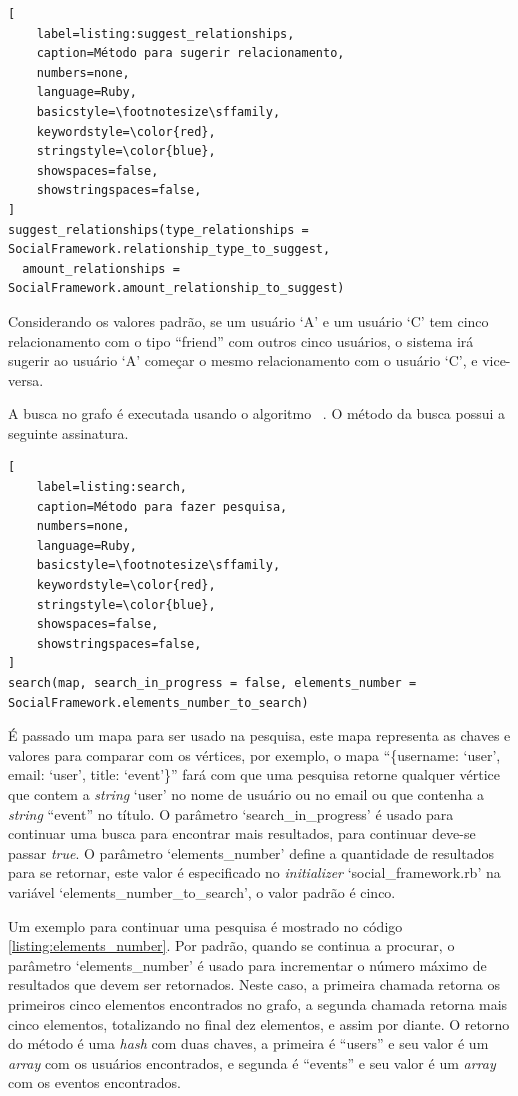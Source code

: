 \begin{lstlisting}[
    label=listing:suggest_relationships,
    caption=Método para sugerir relacionamento,
    numbers=none,
    language=Ruby,
    basicstyle=\footnotesize\sffamily,
    keywordstyle=\color{red},
    stringstyle=\color{blue},
    showspaces=false,
    showstringspaces=false,
]
suggest_relationships(type_relationships = SocialFramework.relationship_type_to_suggest,
  amount_relationships = SocialFramework.amount_relationship_to_suggest)
\end{lstlisting}

Considerando os valores padrão, se um usuário `A' e um usuário `C' tem cinco relacionamento com o tipo  ``friend'' com outros cinco usuários, o sistema irá sugerir ao usuário `A' começar o mesmo relacionamento com o usuário `C', e vice-versa.

A busca no grafo é executada usando o algoritmo ~. O método da busca possui a seguinte assinatura.

\begin{lstlisting}[
    label=listing:search,
    caption=Método para fazer pesquisa,
    numbers=none,
    language=Ruby,
    basicstyle=\footnotesize\sffamily,
    keywordstyle=\color{red},
    stringstyle=\color{blue},
    showspaces=false,
    showstringspaces=false,
]
search(map, search_in_progress = false, elements_number = SocialFramework.elements_number_to_search)
\end{lstlisting}

É passado um mapa para ser usado na pesquisa, este mapa representa as chaves e valores para comparar com os vértices, por exemplo, o mapa ``\{username: `user', email: `user', title: `event'\}'' fará com que uma pesquisa retorne qualquer vértice que contem a \textit{string} `user' no nome de usuário ou no email ou que contenha a \textit{string} ``event'' no título. O parâmetro `search\_in\_progress' é usado para continuar uma busca para encontrar mais resultados, para continuar deve-se passar \textit{true}. O parâmetro `elements\_number' define a quantidade de resultados para se retornar, este valor é especificado no \textit{initializer} `social\_framework.rb' na variável `elements\_number\_to\_search', o valor padrão é cinco.

Um exemplo para continuar uma pesquisa é mostrado no código \ref{listing:elements_number}. Por padrão, quando se continua a procurar, o parâmetro `elements\_number' é usado para incrementar o número máximo de resultados que devem ser retornados. Neste caso, a primeira chamada retorna os primeiros cinco elementos encontrados no grafo, a segunda chamada retorna mais cinco elementos, totalizando no final dez elementos, e assim por diante. O retorno do método é uma \textit{hash} com duas chaves, a primeira é ``users'' e seu valor é um \textit{array} com os usuários encontrados, e segunda é ``events'' e seu valor é um \textit{array} com os eventos encontrados.

